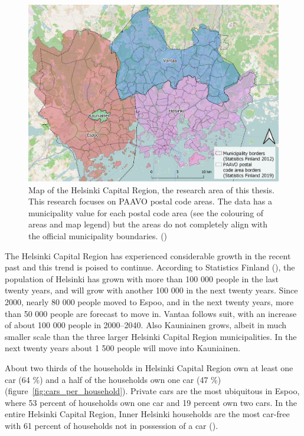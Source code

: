\begin{figure}[H]%
    \includegraphics[width=\textwidth]{images/thesis_resarea.png}
    \caption[Research area map]{Map of the Helsinki Capital Region, the research area of this thesis. This research focuses on PAAVO postal code areas. The data has a municipality value for each postal code area (see the colouring of areas and map legend) but the areas do not completely align with the official municipality boundaries. (\cite{OpenStreetMap})}%
    \label{fig:thesis_resarea}%
\end{figure}

The Helsinki Capital Region has experienced considerable growth in the recent past and this trend is poised to continue. According to Statistics Finland (\citeyear{StatisticsFinland2020c}), the population of Helsinki has grown with more than 100 000 people in the last twenty years, and will grow with another 100 000 in the next twenty years. Since 2000, nearly 80 000 people moved to Espoo, and in the next twenty years, more than 50 000 people are forecast to move in. Vantaa follows suit, with an increase of about 100 000 people in 2000--2040. Also Kauniainen grows, albeit in much smaller scale than the three larger Helsinki Capital Region municipalities. In the next twenty years about 1 500 people will move into Kauniainen.

About two thirds of the households in Helsinki Capital Region own at least one car (64 \%) and a half of the households own one car (47 \%) (figure~\ref{fig:cars_per_household}). Private cars are the most ubiquitous in Espoo, where 53 percent of households own one car and 19 percent own two cars. In the entire Helsinki Capital Region, Inner Helsinki households are the most car-free with 61 percent of households not in possession of a car (\cite{Liikennevirasto2018}).

